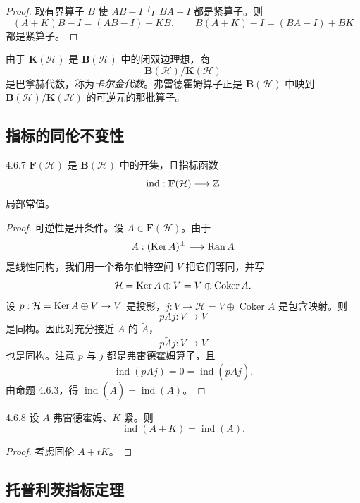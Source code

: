 \begin{proof}
  取有界算子 $B$ 使 $AB-I$ 与 $BA-I$ 都是紧算子。则
  \[
  (A+K)B-I=(AB-I)+KB,\qquad
  B(A+K)-I=(BA-I)+BK
  \]
  都是紧算子。
\end{proof}

由于 $\mathbf{K}(\mathcal{H})$ 是 $\mathbf{B}(\mathcal{H})$ 中的闭双边理想，商
\[
\mathbf{B}(\mathcal{H})/\mathbf{K}(\mathcal{H})
\]
是巴拿赫代数，称为\emph{卡尔金代数}。弗雷德霍姆算子正是 $\mathbf{B}(\mathcal{H})$ 中映到 $\mathbf{B}(\mathcal{H})/\mathbf{K}(\mathcal{H})$ 的可逆元的那批算子。

\subsection{指标的同伦不变性}

\begin{proposition}{4.6.7}
  $\mathbf{F}(\mathcal{H})$ 是 $\mathbf{B}(\mathcal{H})$ 中的开集，且指标函数
  \[
  \operatorname{ind}:\mathbf{F}(\mathcal{H})\longrightarrow\mathbb{Z}
  \]
  局部常值。
\end{proposition}

\begin{proof}
  可逆性是开条件。设 $A\in\mathbf{F}(\mathcal{H})$。由于
  \[
  A:(\operatorname{Ker} A)^\perp\longrightarrow\operatorname{Ran} A
  \]
  是线性同构，我们用一个希尔伯特空间 $V$ 把它们等同，并写
  \[
  \mathcal{H}=\operatorname{Ker} A\oplus V=V\oplus\operatorname{Coker}A.
  \]
  设 $p:\mathcal{H}=\operatorname{Ker} A\oplus V\to V$ 是投影，$j:V\to\mathcal{H}=V\oplus\operatorname{Coker}A$ 是包含映射。则
  \[
  pAj:V\longrightarrow V
  \]
  是同构。因此对充分接近 $A$ 的 $\widetilde{A}$，
  \[
  p\widetilde{A}j:V\longrightarrow V
  \]
  也是同构。注意 $p$ 与 $j$ 都是弗雷德霍姆算子，且
  \[
  \operatorname{ind}(pAj)=0=\operatorname{ind}(p\widetilde{A}j).
  \]
  由命题 4.6.3，得 $\operatorname{ind}(\widetilde{A})=\operatorname{ind}(A)$。
\end{proof}

\begin{corollary}{4.6.8}
  设 $A$ 弗雷德霍姆、$K$ 紧。则
  \[
  \operatorname{ind}(A+K)=\operatorname{ind}(A).
  \]
\end{corollary}

\begin{proof}
  考虑同伦 $A+tK$。
\end{proof}

\subsection{托普利茨指标定理}

